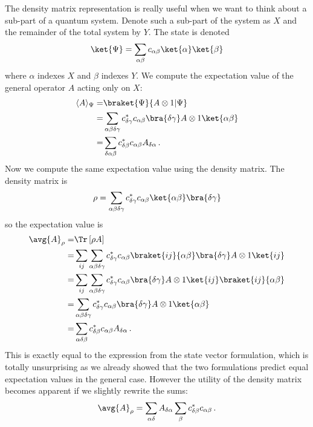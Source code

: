 
The density matrix representation is really useful when we want to think about a sub-part of a quantum system.
Denote such a sub-part of the system as $X$ and the remainder of the total system by $Y$.
The state is denoted
\begin{equation}
  \ket{\Psi} = \sum_{\alpha \beta} c_{\alpha \beta} \ket{\alpha}\ket{\beta}
\end{equation}
where $\alpha$ indexes $X$ and $\beta$ indexes $Y$.
We compute the expectation value of the general operator $A$ acting only on $X$:
\begin{align*}
  \langle A \rangle_{\Psi}
  =& \braket{\Psi}{A \otimes 1|\Psi} \nonumber \\
  =& \sum_{\alpha \beta \delta \gamma} c^*_{\delta \gamma}c_{\alpha \beta} \bra{\delta \gamma} A \otimes 1 \ket{\alpha \beta} \\
  =& \sum_{\delta \alpha \beta} c^*_{\delta \beta} c_{\alpha \beta} A_{\delta \alpha} \, .
\end{align*}
Now we compute the same expectation value using the density matrix.
The density matrix is
\begin{equation*}
  \rho = \sum_{\alpha \beta \delta \gamma} c^*_{\delta \gamma}c_{\alpha \beta} \ket{\alpha \beta}\bra{\delta \gamma}
\end{equation*}
so the expectation value is
\begin{align*}
  \avg{A}_\rho
  =& \Tr \left[\rho A \right] \\
  =& \sum_{ij}\sum_{\alpha \beta \delta \gamma} c^*_{\delta \gamma}c_{\alpha \beta} \braket{ij}{\alpha \beta} \bra{\delta \gamma} A\otimes 1 \ket{ij} \\
  =& \sum_{ij}\sum_{\alpha \beta \delta \gamma} c^*_{\delta \gamma}c_{\alpha \beta} \bra{\delta \gamma} A\otimes 1 \ket{ij} \braket{ij}{\alpha \beta} \\
  =&\sum_{\alpha \beta \delta \gamma} c^*_{\delta \gamma}c_{\alpha \beta} \bra{\delta \gamma} A\otimes 1 \ket{\alpha \beta} \\
  =& \sum_{\alpha \delta \beta} c^*_{\delta \beta} c_{\alpha \beta} A_{\delta \alpha} \, .
\end{align*}
This is exactly equal to the expression from the state vector formulation, which is totally unsurprising as we already showed that the two formulations predict equal expectation values in the general case.
However the utility of the density matrix becomes apparent if we slightly rewrite the sums:
\begin{equation*}
  \avg{A}_\rho = \sum_{\alpha \delta} A_{\delta \alpha} \sum_\beta c^*_{\delta \beta} c_{\alpha \beta} \, .
\end{equation*}
